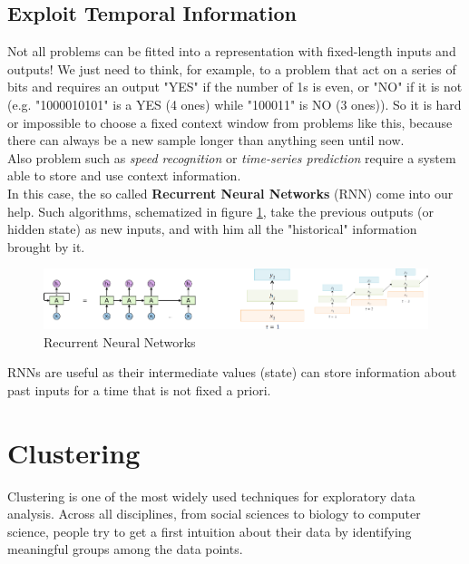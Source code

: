 \documentclass[12pt]{report}
\theoremstyle{plain}
\begin{document}
\begin{flushleft}
\section{Exploit Temporal Information}
Not all problems can be fitted into a representation with fixed-length inputs and outputs! We just need to think, for example, to a problem that act on a series of bits and requires an output "YES" if the number of 1s is even, or "NO" if it is not (e.g. "1000010101" is a YES (4 ones) while "100011" is NO (3 ones)). So it is hard or impossible to choose a fixed context window from problems like this, because there can always be a new sample longer than anything seen until now.\\
Also problem such as \textit{speed recognition} or \textit{time-series prediction} require a system able to store and use context information.\\
In this case, the so called \textbf{Recurrent Neural Networks} (RNN) come into our help. Such algorithms, schematized in figure \ref{fig:DL_RNN}, take the previous outputs (or hidden state) as new inputs, and with him all the "historical" information brought by it. 
\begin{figure}[!h]
	\centering
	\includegraphics[scale=1]{images/DL_RNN.pdf}
	\caption{Recurrent Neural Networks}
	\label{fig:DL_RNN}
\end{figure}
RNNs are useful as their intermediate values (state) can store information about past inputs for a time that is not fixed a priori.











\chapter{Clustering}
Clustering is one of the most widely used techniques for exploratory data analysis. Across all disciplines, from social sciences to biology to computer science, people try to get a first intuition about their data by identifying meaningful groups among the data points.\\


\end{flushleft}
\end{document}
